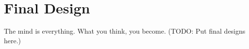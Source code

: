\chapter{Final Design}
The mind is everything. What you think, you become.
(TODO: Put final designs here.)

